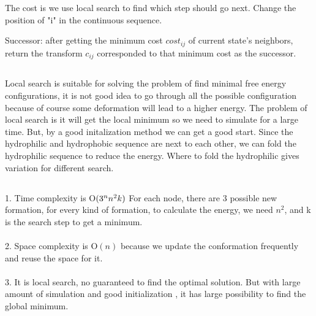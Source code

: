 \documentclass[12pt]{article}
\begin{document}
		The cost is we use local search to find which step should go next. Change the position of "i" in the continuous sequence. 
		
		Successor: after getting the minimum cost ${cost_{ij}}$ of current state's neighbors, return the transform ${c_{ij}}$ corresponded to that minimum cost as the successor. 
		
		\subsection{}
		\paragraph{}
		Local search is suitable for solving the problem of find minimal free energy configurations, it is not good idea to go through all the possible configuration because of course some deformation will lead to a higher energy. The problem of local search is it will get the local minimum so we need to simulate for a large time. But, by a good initalization method we can get a good start. Since the hydrophilic and hydrophobic sequence are next to each other, we can fold the hydrophilic sequence to reduce the energy. Where to fold the  hydrophilic gives variation for different search. 
		
		\subsection{}

		\paragraph{}	
			1. Time complexity is O${(3^n\*n^2\*k)}$ For each node, there are 3 possible new formation, for every kind of formation, to calculate the energy, we need $n^2$, and k is the search step to get a minimum.
			
		\paragraph{}
			2. Space complexity is O${(n)}$ because we update the conformation frequently and reuse the space for it. 
		\paragraph{}	
			3. It is local search, no guaranteed to find the optimal solution. But with large amount of simulation and good initialization , it has large possibility to find the global minimum. 
\end{document}
